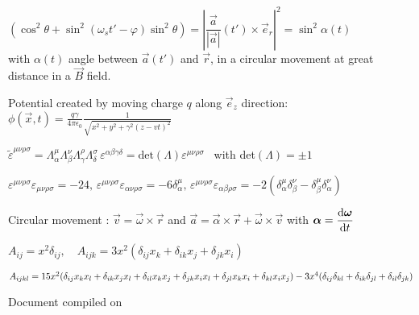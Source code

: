 \item $\left(\cos^2\theta + \sin^2(\omega_st' - \varphi)\sin^2\theta\right) = \left| \dfrac{\vec{a}}{|\vec{a}|}(t') \times \vec{e}_r \right|^2 =  \sin^2\alpha(t)$ \\
with $\alpha(t)$ angle between $\vec{a}(t')$ and $\vec{r}$, in a circular movement at great distance in a $\vec{B}$ field.%

\item Potential created by moving charge $q$ along $\vec{e}_z$ direction:\\
$\phi(\vec{x},t)=\frac{q\gamma}{4\pi\epsilon_0}\frac{1}{\sqrt{x^2+y^2+\gamma^2(z-vt)^2}}$


\item$\tilde{\varepsilon}^{\mu\nu\rho\sigma} = \Lambda^{\mu}_{\alpha}\Lambda^{\nu}_{\beta}\Lambda^{\rho}_{\gamma}\Lambda^{\sigma}_{\delta} \, \varepsilon^{\alpha\beta\gamma\delta} = \text{det}(\Lambda)\varepsilon^{\mu\nu\rho\sigma}$ \, with det$(\Lambda) = \pm 1$

\item$\varepsilon^{\mu\nu\rho\sigma}\varepsilon_{\mu\nu\rho\sigma} = -24, \, \varepsilon^{\mu\nu\rho\sigma}\varepsilon_{\alpha\nu\rho\sigma} = -6\delta^{\mu}_{\alpha}, \, \varepsilon^{\mu\nu\rho\sigma}\varepsilon_{\alpha\beta\rho\sigma} = -2(\delta^{\mu}_{\alpha}\delta^{\nu}_{\beta} - \delta^{\mu}_{\beta}\delta^{\nu}_{\alpha})$

\item Circular movement : $\vec{v} = \vec{\omega} \times \vec{r}$ and $\vec{a} = \vec{\alpha} \times \vec{r} + \vec{\omega} \times \vec{v}$ with $\mbox{\boldmath$\alpha$} = \dfrac{\textrm{d} \mbox{\boldmath$\omega$}}{\textrm{d} t}$

\item $A_{ij} = x^2 \delta_{ij}, \quad A_{ijk} = 3x^2(\delta_{ij}x_k + \delta_{ik}x_j + \delta_{jk}x_i)$

\item $A_{ijkl} = 15x^2(\delta_{ij}x_kx_l + \delta_{ik}x_jx_l + \delta_{il}x_kx_j + \delta_{jk}x_ix_l + \delta_{jl}x_kx_i + \delta_{kl}x_ix_j) -\\
3x^4(\delta_{ij}\delta_{kl} + \delta_{ik}\delta_{jl} + \delta_{il}\delta_{jk})$

\squishend
\begin{flushright}
Document compiled on \DTMnow
\end{flushright}